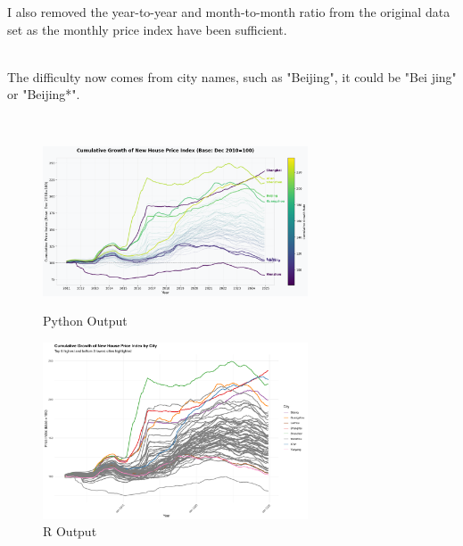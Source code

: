 \documentclass[12pt,letterpaper]{article}
\begin{document}
	I also removed the year-to-year and month-to-month ratio from the original data set as the monthly price index have been sufficient.
	
	\smallskip\\
The difficulty now comes from city names, such as "Beijing", it could be "Bei jing" or "Beijing*".
	
	\medskip\\

\begin{figure}[htbp]
	\centering
	\begin{minipage}{\textwidth}
		\centering
		\includegraphics[width=0.7\textwidth]{PS6a_Gao.png}
		\caption{Python Output}
	\end{minipage}
	
	\vspace{0.5cm}
	
	\begin{minipage}{\textwidth}
		\centering
		\includegraphics[width=0.7\textwidth]{PS6b_Gao.png}
		\caption{R Output}
	\end{minipage}
	
	\vspace{0.5cm}
	

\end{figure}
\end{document}
